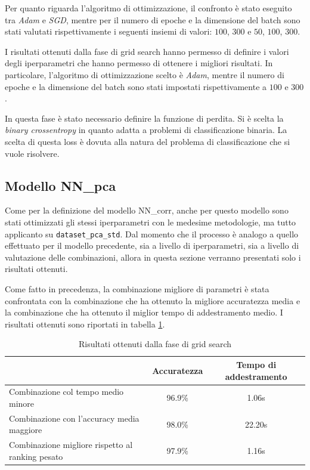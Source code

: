 Per quanto riguarda l'algoritmo di ottimizzazione, il confronto è stato eseguito
tra \textit{Adam} e \textit{SGD}, mentre per il numero di epoche e la dimensione
del batch sono stati valutati rispettivamente i seguenti insiemi di valori: $100$, $300$ e $50$,
$100$, $300$.

I risultati ottenuti dalla fase di grid search hanno permesso di definire i valori
degli iperparametri che hanno permesso di ottenere i migliori risultati. In
particolare, l'algoritmo di ottimizzazione scelto è \textit{Adam}, mentre il
numero di epoche e la dimensione del batch sono stati impostati rispettivamente 
a $100$ e $300$.

In questa fase è stato necessario definire la funzione di perdita. Si è scelta
la \textit{binary crossentropy} in quanto adatta a problemi di classificazione
binaria. La scelta di questa loss è dovuta alla natura del problema di
classificazione che si vuole risolvere.

\subsection{Modello NN\_pca}

Come per la definizione del modello NN\_corr, anche per questo modello sono stati 
ottimizzati gli stessi iperparametri con le medesime metodologie, ma tutto applicanto
su \texttt{dataset\_pca\_std}. Dal momento che il processo è analogo a quello 
effettuato per il modello precedente, sia a livello di iperparametri, sia a livello 
di valutazione delle combinazioni, allora in questa sezione verranno presentati
solo i risultati ottenuti. 

Come fatto in precedenza, la combinazione migliore di parametri è stata confrontata 
con la combinazione che ha ottenuto la migliore accuratezza media e la combinazione 
che ha ottenuto il miglior tempo di addestramento medio. I risultati ottenuti sono 
riportati in tabella \ref{tab:ris-grid-search-pca}.

\begin{table}[ht]
    \centering
    \begin{tabular}{@{}lcc@{}}
        \toprule
        \rowcolor[HTML]{EFEFEF}
        \multicolumn{1}{c}{\cellcolor[HTML]{EFEFEF}\textbf{Combinazione di parametri}} & \textbf{Accuratezza} & \textbf{Tempo di addestramento} \\ \midrule
        Combinazione col tempo medio minore & 96.9\%               & 1.06s                           \\
        Combinazione con l'accuracy media maggiore          & 98.0\%               & 22.20s                          \\
        Combinazione migliore rispetto al ranking pesato                & 97.9\%               & 1.16s                           \\ \bottomrule
    \end{tabular}
    \caption{Risultati ottenuti dalla fase di grid search}
    \label{tab:ris-grid-search-pca}
\end{table}

